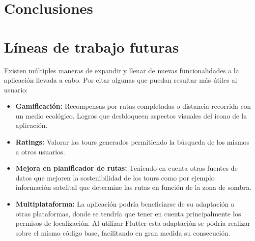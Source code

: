 \section*{Conclusiones}
\section*{Líneas de trabajo futuras}
Existen múltiples maneras de expandir y llenar de nuevas funcionalidades a la aplicación llevada a cabo.
Por citar algunas que puedan resultar más útiles al usuario:
\begin{itemize}
    \item \textbf{Gamificación:} Recompensas por rutas completadas o distancia recorrida con un medio ecológico. Logros que desbloqueen aspectos visuales del icono de la aplicación.
    \item \textbf{Ratings:} Valorar las tours generados permitiendo la búsqueda de los mismos a otros usuarios.
    \item \textbf{Mejora en planificador de rutas:} Teniendo en cuenta otras fuentes de datos que mejoren la sostenibilidad de los tours como por ejemplo información satelital que determine las rutas en función de la zona de sombra.
    \item \textbf{Multiplataforma:} La aplicación podría beneficiarse de su adaptación a otras plataformas, donde se tendría que tener en cuenta principalmente los permisos de localización. Al utilizar Flutter esta adaptación se podría realizar sobre el mismo código base, facilitando en gran medida su consecución.
\end{itemize}
